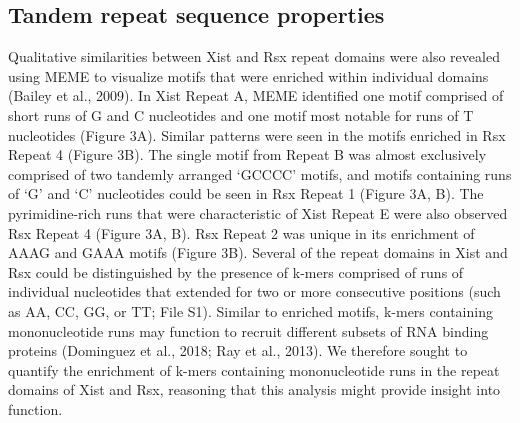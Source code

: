\subsection{Tandem repeat sequence properties}
Qualitative similarities between Xist and Rsx repeat domains were also revealed using MEME to visualize motifs that were enriched within individual domains (Bailey et al., 2009). In Xist Repeat A, MEME identified one motif comprised of short runs of G and C nucleotides and one motif most notable for runs of T nucleotides (Figure 3A). Similar patterns were seen in the motifs enriched in Rsx Repeat 4 (Figure 3B). The single motif from Repeat B was almost exclusively comprised of two tandemly arranged ‘GCCCC’ motifs, and motifs containing runs of ‘G’ and ‘C’ nucleotides could be seen in Rsx Repeat 1 (Figure 3A, B). The pyrimidine-rich runs that were characteristic of Xist Repeat E were also observed Rsx Repeat 4 (Figure 3A, B). Rsx Repeat 2 was unique in its enrichment of AAAG and GAAA motifs (Figure 3B).
Several of the repeat domains in Xist and Rsx could be distinguished by the presence of k-mers comprised of runs of individual nucleotides that extended for two or more consecutive positions (such as AA, CC, GG, or TT; File S1). Similar to enriched motifs, k-mers containing mononucleotide runs may function to recruit different subsets of RNA binding proteins (Dominguez et al., 2018; Ray et al., 2013). We therefore sought to quantify the enrichment of k-mers containing mononucleotide runs in the repeat domains of Xist and Rsx, reasoning that this analysis might provide insight into function. 

